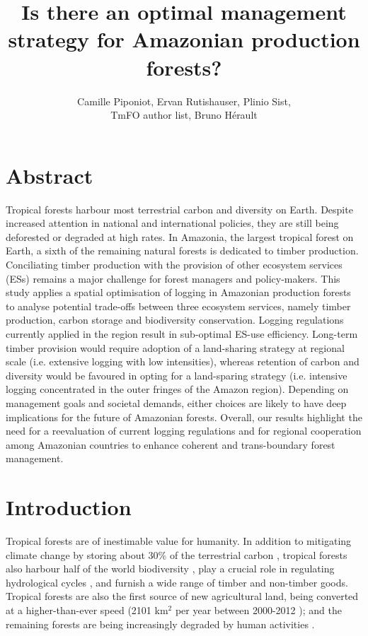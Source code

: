 \documentclass{article}
\title{Is there an optimal management strategy for Amazonian production forests?}
\author{Camille Piponiot, Ervan Rutishauser, Plinio Sist,\\ TmFO author list, Bruno Hérault}
\date{}
\begin{document}
\maketitle 

\section{Abstract}

Tropical forests harbour most terrestrial carbon and diversity on Earth. Despite increased attention in national and international policies, they are still being deforested or degraded at high rates. 
In Amazonia, the largest tropical forest on Earth, a sixth of the remaining natural forests is dedicated to timber production. Conciliating timber production with the provision of other ecosystem services (ESs) remains a major challenge for forest managers and policy-makers. This study applies a spatial optimisation of logging in Amazonian production forests to analyse potential trade-offs between three ecosystem services, namely timber production, carbon storage and biodiversity conservation.  
Logging regulations currently applied in the region result in sub-optimal ES-use efficiency. Long-term timber provision would require adoption of a land-sharing strategy at regional scale (i.e. extensive logging with low intensities), whereas retention of carbon and diversity would be favoured in opting for a land-sparing strategy (i.e. intensive logging concentrated in the outer fringes of the Amazon region). Depending on management goals and societal demands, either choices are likely to have deep implications for the future of Amazonian forests. Overall, our results highlight the need for a reevaluation of current logging regulations and for regional cooperation among Amazonian countries to enhance coherent and trans-boundary forest management.

\twocolumn

\section{Introduction}


Tropical forests are of inestimable value for humanity. In addition to mitigating climate change by storing about 30\% of the terrestrial carbon \cite{Pan2013}, tropical forests also harbour half of the world biodiversity \cite{Pimm2014}, play a crucial role in regulating hydrological cycles \cite{Fisher2009a}, and furnish a wide range of timber and non-timber goods. Tropical forests are also the first source of new agricultural land, being converted at a higher-than-ever speed (2101 km$^2$ per year between 2000-2012 \cite{Hansen2013}); and the remaining forests are being increasingly degraded by human activities \cite{Potapov2017}. 
\end{document}
